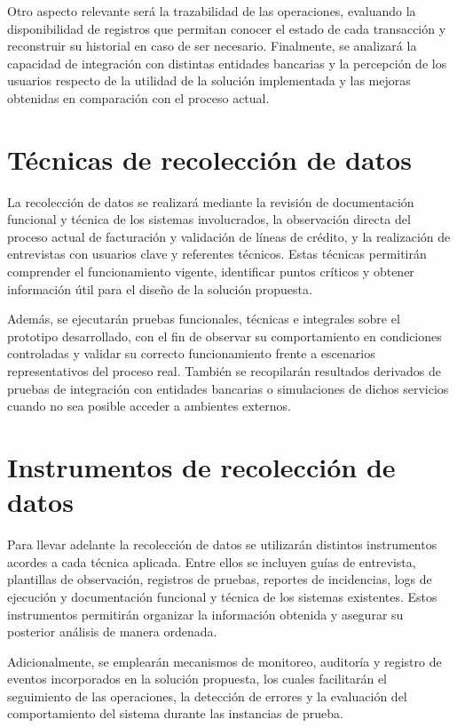 Otro aspecto relevante será la trazabilidad de las operaciones, evaluando la disponibilidad de registros que permitan conocer el estado de cada transacción y reconstruir su historial en caso de ser necesario. Finalmente, se analizará la capacidad de integración con distintas entidades bancarias y la percepción de los usuarios respecto de la utilidad de la solución implementada y las mejoras obtenidas en comparación con el proceso actual.

\section{Técnicas de recolección de datos}

La recolección de datos se realizará mediante la revisión de documentación funcional y técnica de los sistemas involucrados, la observación directa del proceso actual de facturación y validación de líneas de crédito, y la realización de entrevistas con usuarios clave y referentes técnicos. Estas técnicas permitirán comprender el funcionamiento vigente, identificar puntos críticos y obtener información útil para el diseño de la solución propuesta.

Además, se ejecutarán pruebas funcionales, técnicas e integrales sobre el prototipo desarrollado, con el fin de observar su comportamiento en condiciones controladas y validar su correcto funcionamiento frente a escenarios representativos del proceso real. También se recopilarán resultados derivados de pruebas de integración con entidades bancarias o simulaciones de dichos servicios cuando no sea posible acceder a ambientes externos.

\section{Instrumentos de recolección de datos}

Para llevar adelante la recolección de datos se utilizarán distintos instrumentos acordes a cada técnica aplicada. Entre ellos se incluyen guías de entrevista, plantillas de observación, registros de pruebas, reportes de incidencias, logs de ejecución y documentación funcional y técnica de los sistemas existentes. Estos instrumentos permitirán organizar la información obtenida y asegurar su posterior análisis de manera ordenada.

Adicionalmente, se emplearán mecanismos de monitoreo, auditoría y registro de eventos incorporados en la solución propuesta, los cuales facilitarán el seguimiento de las operaciones, la detección de errores y la evaluación del comportamiento del sistema durante las instancias de prueba.

